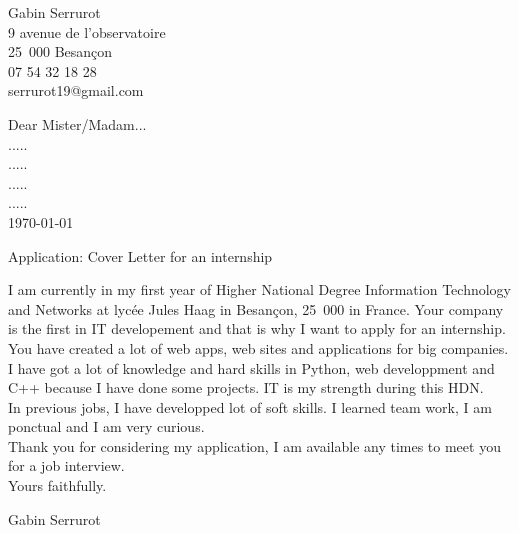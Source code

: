 \documentclass[11pt,a4paper,openany]{book}
\begin{document}
\begin{flushleft}
Gabin Serrurot\\
9 avenue de l'observatoire\\
25~000 Besançon\\
07 54 32 18 28\\
serrurot19@gmail.com\newline
\end{flushleft}

\medskip

\begin{flushright}
Dear Mister/Madam...\\
.....\\
.....\\
.....\\
.....\\
\today\\
\end{flushright}

\medskip

\begin{flushleft}
Application: Cover Letter for an internship \newline
\end{flushleft}

I am currently in my first year of Higher National Degree Information Technology and Networks at lycée Jules Haag in Besançon, 25~000 in France. Your company is the first in IT developement and that is why I want to apply for an internship.\newline
You have created a lot of web apps, web sites and applications for big companies.\\
I have got a lot of knowledge and hard skills in Python, web developpment and C++ because I have done some projects. IT is my strength during this HDN.\\
In previous jobs, I have developped lot of soft skills. I learned team work, I am ponctual and I am very curious.\\

Thank you for considering my application, I am available any times to meet you for a job interview.\\

Yours faithfully.\\

\begin{flushright}
Gabin Serrurot
\end{flushright}
\end{document}
